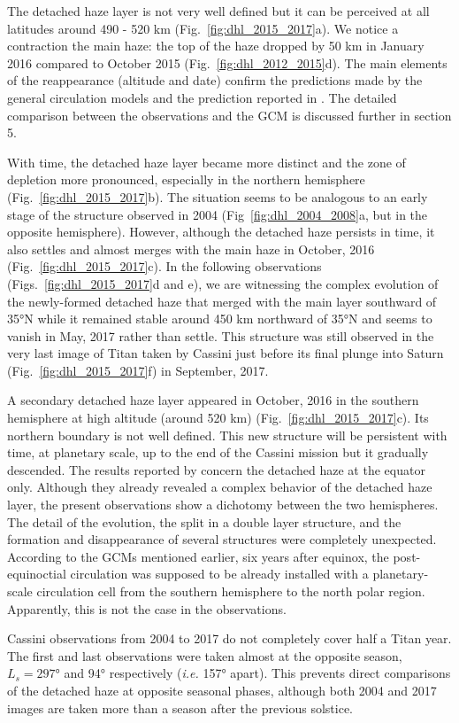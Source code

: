 The detached haze layer is not very well defined but it can be perceived at all latitudes
around 490 - 520 km (Fig.~\ref{fig:dhl_2015_2017}a). We notice a contraction
the main haze: the top of the haze dropped by 50 km in January 2016 compared to October 2015
(Fig.~\ref{fig:dhl_2012_2015}d). The main elements of the reappearance (altitude and date) confirm the
predictions made by the general circulation models \citep{Lebonnois2012,Larson2015} and the prediction
reported in \cite{West2011}. The detailed comparison between the observations and the GCM is discussed further
in section 5.

With time, the detached haze layer became more distinct and the zone of depletion more pronounced, especially in the
northern hemisphere (Fig.~\ref{fig:dhl_2015_2017}b). The situation seems to be analogous to an early stage of
the structure observed in 2004 (Fig~\ref{fig:dhl_2004_2008}a, but in the opposite hemisphere).
However, although the detached haze persists in time,
it also settles and almost merges with the main haze in October, 2016 (Fig.~\ref{fig:dhl_2015_2017}c).
In the  following observations (Figs.~\ref{fig:dhl_2015_2017}d and e), we are
witnessing the complex evolution of the newly-formed detached haze that merged with the main layer southward
of \ang{35}N while it remained stable around 450 km northward of \ang{35}N and seems to vanish in May, 2017 rather than settle.
This structure was still observed in the very last image of Titan taken by Cassini just before its final plunge into Saturn
 (Fig.~\ref{fig:dhl_2015_2017}f) in September, 2017.

A secondary detached haze layer appeared in October, 2016 in the southern hemisphere at high altitude (around 520 km)
(Fig.~\ref{fig:dhl_2015_2017}c). Its northern boundary is not well defined. This new structure will be persistent with
time, at planetary scale, up to the end of the Cassini mission but it gradually descended. The results reported by \cite{West2018}
concern the detached haze at the equator only. Although they already revealed a complex behavior of the detached haze layer, the
present observations show a dichotomy between the two hemispheres. The detail of the evolution, the split in a double layer
structure, and the formation and disappearance of several structures were completely unexpected. According to the GCMs mentioned earlier, six years
after equinox, the post-equinoctial circulation was supposed to be already installed with a planetary-scale circulation cell
from the southern hemisphere to the north polar region. Apparently, this is not the case in the observations.

Cassini observations from 2004 to 2017 do not completely cover half a Titan year. The first and last observations
were taken almost at the opposite season, $L_s=\ang{297}$ and \ang{94} respectively (\emph{i.e.} \ang{157} apart).
This prevents direct comparisons of the detached haze at opposite seasonal phases,
although both 2004 and 2017 images are taken more than a season after the previous solstice.
